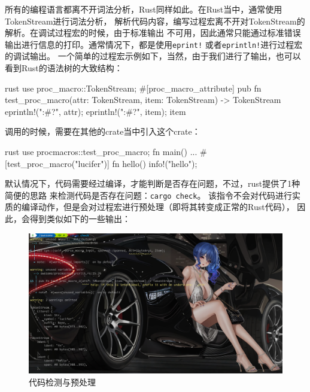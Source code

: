 所有的编程语言都离不开词法分析，Rust同样如此。在Rust当中，通常使用TokenStream进行词法分析，
解析代码内容，编写过程宏离不开对TokenStream的解析。在调试过程宏的时候，由于标准输出
不可用，因此通常只能通过标准错误输出进行信息的打印。通常情况下，都是使用\texttt{eprint!}
或者\texttt{eprintln!}进行过程宏的调试输出。
一个简单的过程宏示例如下，当然，由于我们进行了输出，也可以看到Rust的语法树的大致结构：
\begin{code-block}{rust}
use proc_macro::TokenStream;
#[proc_macro_attribute]
pub fn test_proc_macro(attr: TokenStream, item: TokenStream) -> TokenStream {
    eprintln!("{:#?}", attr);
    eprintln!("{:#?}", item);
    item
}
\end{code-block}
调用的时候，需要在其他的crate当中引入这个crate：
\begin{code-block}{rust}
use procmacros::test_proc_macro;
fn main() {
    ...
}
#[test_proc_macro("lucifer")]
fn hello() {
    info!("hello");
}
\end{code-block}

默认情况下，代码需要经过编译，才能判断是否存在问题，不过，rust提供了1种简便的思路
来检测代码是否存在问题：\texttt{cargo check}。
该指令不会对代码进行实质的编译动作，但是会对过程宏进行预处理（即将其转变成正常的Rust代码），
因此，会得到类似如下的一些输出：
\begin{figure}[H]
  \centering
  \includegraphics[width=\linewidth]{rust_cargo_check.png}
  \caption{代码检测与预处理}
  \label{fig:rust_cargo_check}
\end{figure}

